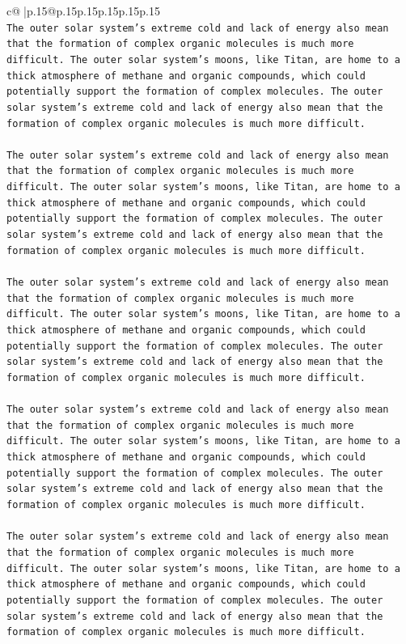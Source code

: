 \documentclass{article}
\begin{document}
{\begin{supertabular}{c@{$\;$}|p{.15\linewidth}@{}p{.15\linewidth}p{.15\linewidth}p{.15\linewidth}p{.15\linewidth}p{.15\linewidth}}
{{{\\ 
\texttt{The outer solar system's extreme cold and lack of energy also mean that the formation of complex organic molecules is much more difficult. The outer solar system's moons, like Titan, are home to a thick atmosphere of methane and organic compounds, which could potentially support the formation of complex molecules. The outer solar system's extreme cold and lack of energy also mean that the formation of complex organic molecules is much more difficult.} \\
\\ 
\texttt{The outer solar system's extreme cold and lack of energy also mean that the formation of complex organic molecules is much more difficult. The outer solar system's moons, like Titan, are home to a thick atmosphere of methane and organic compounds, which could potentially support the formation of complex molecules. The outer solar system's extreme cold and lack of energy also mean that the formation of complex organic molecules is much more difficult.} \\
\\ 
\texttt{The outer solar system's extreme cold and lack of energy also mean that the formation of complex organic molecules is much more difficult. The outer solar system's moons, like Titan, are home to a thick atmosphere of methane and organic compounds, which could potentially support the formation of complex molecules. The outer solar system's extreme cold and lack of energy also mean that the formation of complex organic molecules is much more difficult.} \\
\\ 
\texttt{The outer solar system's extreme cold and lack of energy also mean that the formation of complex organic molecules is much more difficult. The outer solar system's moons, like Titan, are home to a thick atmosphere of methane and organic compounds, which could potentially support the formation of complex molecules. The outer solar system's extreme cold and lack of energy also mean that the formation of complex organic molecules is much more difficult.} \\
\\ 
\texttt{The outer solar system's extreme cold and lack of energy also mean that the formation of complex organic molecules is much more difficult. The outer solar system's moons, like Titan, are home to a thick atmosphere of methane and organic compounds, which could potentially support the formation of complex molecules. The outer solar system's extreme cold and lack of energy also mean that the formation of complex organic molecules is much more difficult.} \\
}}}
\end{supertabular}}
\end{document}

